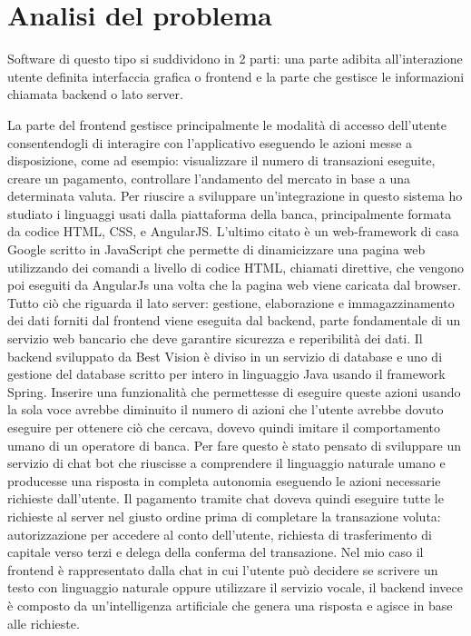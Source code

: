 \section{Analisi del problema}
Software di questo tipo si suddividono in 2 parti: una parte adibita all'interazione utente definita interfaccia grafica o frontend e la parte che gestisce le informazioni chiamata backend o lato server.

La parte del frontend gestisce principalmente le modalità di accesso dell'utente consentendogli di interagire con l'applicativo eseguendo le azioni messe a disposizione, come ad esempio: visualizzare il numero di transazioni eseguite, creare un pagamento, controllare l'andamento del mercato in base a una determinata valuta.
Per riuscire a sviluppare un'integrazione in questo sistema ho studiato i linguaggi usati dalla piattaforma della banca, principalmente formata da codice HTML, CSS, e AngularJS.
L'ultimo citato è un web-framework di casa Google scritto in JavaScript che permette di dinamicizzare una pagina web utilizzando dei comandi a livello di codice HTML, chiamati direttive, che vengono poi eseguiti da AngularJs una volta che la pagina web viene caricata dal browser.
Tutto ciò che riguarda il lato server: gestione, elaborazione e immagazzinamento dei dati forniti dal frontend viene eseguita dal backend, parte fondamentale di un servizio web bancario che deve garantire sicurezza e reperibilità dei dati. Il backend sviluppato da Best Vision è diviso in un servizio di database e uno di gestione del database scritto per intero in linguaggio Java usando il framework Spring.
Inserire una funzionalità che permettesse di eseguire queste azioni usando la sola voce avrebbe diminuito il numero di azioni che l'utente avrebbe dovuto eseguire per ottenere ciò che cercava, dovevo quindi imitare il comportamento umano di un operatore di banca. Per fare questo è stato pensato di sviluppare un servizio di chat bot che riuscisse a comprendere il linguaggio naturale umano e producesse una risposta in completa autonomia eseguendo le azioni necessarie richieste dall'utente.
Il pagamento tramite chat doveva quindi eseguire tutte le richieste al server nel giusto ordine prima di completare la transazione voluta: autorizzazione per accedere al conto dell'utente, richiesta di trasferimento di capitale verso terzi e delega della conferma del transazione.
Nel mio caso il frontend è rappresentato dalla chat in cui l'utente può decidere se scrivere un testo con linguaggio naturale oppure utilizzare il servizio vocale, il backend invece è composto da un'intelligenza artificiale che genera una risposta e agisce in base alle richieste.
